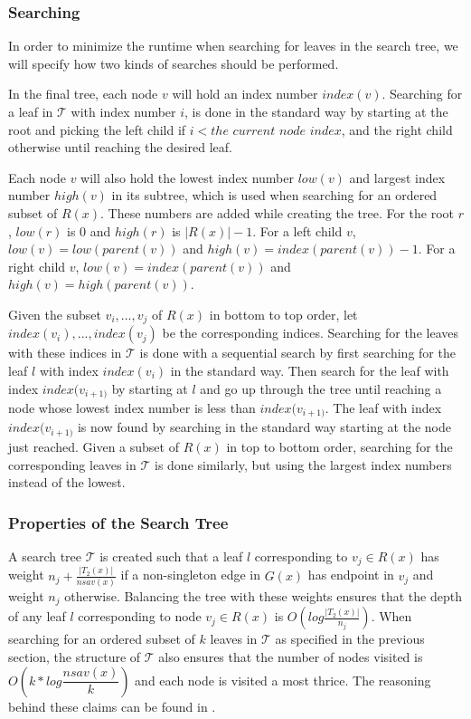 \subsubsection{Searching}
\label{st_searching}
In order to minimize the runtime when searching for leaves in the search tree, we will specify how two kinds of searches should be performed.

In the final tree, each node $v$ will hold an index number $index(v)$. Searching for a leaf in $\mathcal{T}$ with index number $i$, is done in the standard way by starting at the root and picking the left child if $i < the$ $current$ $node$ $index$, and the right child otherwise until reaching the desired leaf.

Each node $v$ will also hold the lowest index number $low(v)$ and largest index number $high(v)$ in its subtree, which is used when searching for an ordered subset of $R(x)$. These numbers are added while creating the tree. For the root $r$, $low(r)$ is 0 and $high(r)$ is $|R(x)|-1$. For a left child $v$, $low(v)=low(parent(v))$ and $high(v)=index(parent(v))-1$. For a right child $v$, $low(v)=index(parent(v))$ and $high(v)=high(parent(v))$.

Given the subset ${v_i, ..., v_j}$ of $R(x)$ in bottom to top order, let ${index(v_i), ..., index(v_j)}$ be the corresponding indices. Searching for the leaves with these indices in $\mathcal{T}$ is done with a sequential search by first searching for the leaf $l$ with index $index(v_i)$ in the standard way. Then search for the leaf with index $index(v_{i+1)}$ by starting at $l$ and go up through the tree until reaching a node whose lowest index number is less than $index(v_{i+1)}$. The leaf with index $index(v_{i+1)}$ is now found by searching in the standard way starting at the node just reached. Given a subset of $R(x)$ in top to bottom order, searching for the corresponding leaves in $\mathcal{T}$ is done similarly, but using the largest index numbers instead of the lowest.

\subsubsection{Properties of the Search Tree}
\label{stProperties}
A search tree $\mathcal{T}$ is created such that a leaf $l$ corresponding to $v_j \in R(x)$ has weight $n_j + \frac{|T_2(x)|}{nsav(x)}$ if a non-singleton edge in $G(x)$ has endpoint in $v_j$ and weight $n_j$ otherwise. Balancing the tree with these weights ensures that the depth of any leaf $l$ corresponding to node $v_j \in R(x)$ is $O(log\frac{|T_2(x)|}{n_j})$. When searching for an ordered subset of $k$ leaves in $\mathcal{T}$ as specified in the previous section, the structure of $\mathcal{T}$ also ensures that the number of nodes visited is $O(k*log \dfrac{nsav(x)}{k})$ and each node is visited a most thrice. The reasoning behind these claims can be found in \cite{nlogn}.

